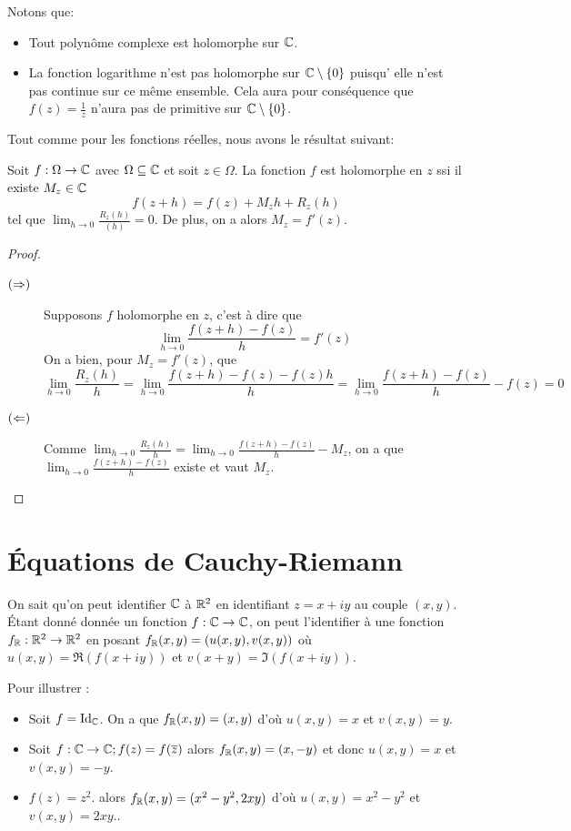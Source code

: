 \begin{remarque}
    Notons que:
    \begin{itemize}
        \item Tout polynôme complexe est holomorphe sur $\mathbb{C}$.
        \item La fonction logarithme n'est pas holomorphe sur $\mathbb{C}\setminus\{0\}$ puisqu' elle n'est pas continue sur ce même ensemble. Cela aura pour conséquence que $f(z)= \frac{1}{z}$ n'aura pas de primitive sur $\mathbb{C} \setminus \{0\}$.
    \end{itemize}
\end{remarque}
 Tout comme pour les fonctions réelles, nous avons le résultat suivant:

 \begin{proposition}
     Soit $f: \Omega\to \mathbb{C}$ avec $\Omega\subseteq \mathbb{C}$ et soit $z\in\Omega$. La fonction $f$ est holomorphe en $z$ ssi il existe $M_z\in \mathbb{C}$ $$
     f(z+h)= f(z)+M_zh+ R_z(h)
     $$ tel que $\lim_{h\to 0}\frac{R_z(h)}{(h)} = 0$. De plus, on a alors $M_z = f'(z)$.
 \end{proposition}

\begin{proof}
\begin{description}
    \item[$(\Rightarrow)$] Supposons $f$ holomorphe en $z$, c'est à dire que 
    $$\lim_{h\to 0}\frac{f(z+h)-f(z)}{h}=f'(z)$$ On a bien, pour $M_z = f'(z)$, que  $$
    \lim_{h\to 0}\frac{R_z(h)}{h}= \lim_{h\to 0}\frac{f(z+h)-f(z)- f(z)h}{h}=\lim_{h\to 0}\frac{f(z+h)-f(z)}{h}- f(z)= 0
    $$
    \item[$(\Leftarrow)$] Comme $\lim_{h\to 0}\frac{R_z(h)}{h} = \lim_{h\to 0}\frac{f(z+h) - f(z)}{h}-M_z$, on a que $\lim_{h\to 0}\frac{f(z+h) - f(z)}{h}$ existe et vaut $M_z$.
\end{description}
\end{proof}

\newpage

\section{Équations de Cauchy-Riemann}
On sait qu'on peut identifier $\mathbb{C}$ à $\mathbb{R}^2$ en identifiant $z = x + iy$ au couple $(x,y)$. Étant donné donnée un fonction $f:\mathbb{C}\to\mathbb{C}$, on peut l'identifier à une fonction $f_{\mathbb{R}}:\mathbb{R}^2\to\mathbb{R}^2$ en posant
$f_{\mathbb{R}}(x,y)= (u(x,y), v(x,y))$ où $u(x,y)= \Re(f(x+iy))$ et $v(x+y)= \Im(f(x+iy))$.
\begin{exemple}
Pour illustrer :
\begin{itemize}
    \item Soit $f = \mathrm{Id}_{\mathbb{C}}$. On a que $f_{\mathbb{R}}(x,y) = (x,y)$ d'où $u(x,y) = x$ et $v(x,y) = y$.
    \item Soit $f:\mathbb{C}\to \mathbb{C}; f(z)= f(\overline{z})$ alors $f_{\mathbb{R}}(x,y) = (x,-y)$ et donc $u(x,y) = x$ et $v(x,y) = -y$.
    \item $f(z)= z^2$. alors $f_{\mathbb{R}}(x,y)=(x^2-y^2, 2xy)$ d'où $u(x,y) = x^2-y^2$ et $v(x,y) = 2xy$..

\end{itemize}
\end{exemple}

